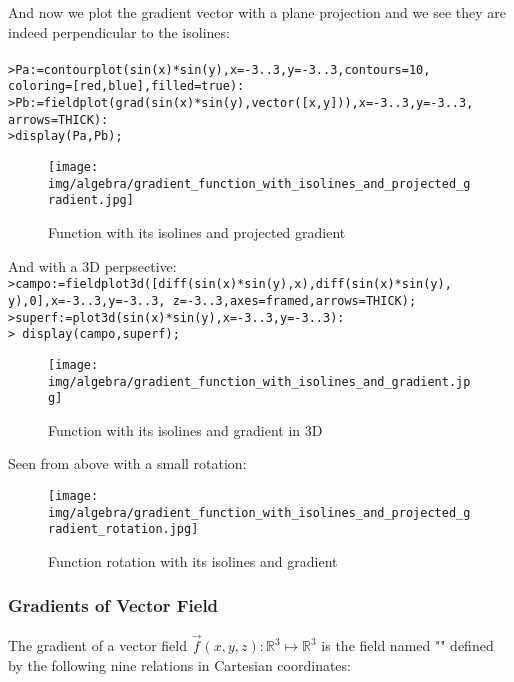 	\pagebreak
	\begin{tcolorbox}[colframe=black,colback=white,sharp corners]

	And now we plot the gradient vector with a plane projection and we see they are indeed perpendicular to the isolines:\\\\
		\texttt{>Pa:=contourplot(sin(x)*sin(y),x=-3..3,y=-3..3,contours=10,\\
		coloring=[red,blue],filled=true):
\\
	>Pb:=fieldplot(grad(sin(x)*sin(y),vector([x,y])),x=-3..3,y=-3..3,\\
	arrows=THICK):\\
	>display(Pa,Pb);}
	\begin{figure}[H]
		\centering
		\texttt{[image: img/algebra/gradient\_function\_with\_isolines\_and\_projected\_gradient.jpg]}
		\caption[]{Function with its isolines and projected gradient}
	\end{figure}
	And with a 3D perpsective:\\
	
	\texttt{>campo:=fieldplot3d([diff(sin(x)*sin(y),x),diff(sin(x)*sin(y),\\
	y),0],x=-3..3,y=-3..3,
z=-3..3,axes=framed,arrows=THICK);\\
>superf:=plot3d(sin(x)*sin(y),x=-3..3,y=-3..3):
\\
	> display({campo,superf});}
	\begin{figure}[H]
		\centering
		\texttt{[image: img/algebra/gradient\_function\_with\_isolines\_and\_gradient.jpg]}
		\caption[]{Function with its isolines and gradient in 3D}
	\end{figure}
	\end{tcolorbox}

	\pagebreak
	\begin{tcolorbox}[colframe=black,colback=white,sharp corners]
	Seen from above with a small rotation:\\
	\begin{figure}[H]
		\centering
		\texttt{[image: img/algebra/gradient\_function\_with\_isolines\_and\_projected\_gradient\_rotation.jpg]}
		\caption[]{Function rotation with its isolines and gradient}
	\end{figure}
	\end{tcolorbox}
	
	\subsubsection{Gradients of Vector Field}
	The gradient of a vector field $\vec{f}(x,y,z): \mathbb{R}^3\mapsto\mathbb{R}^3$ is the field named "" defined by the following nine relations in Cartesian coordinates:
	 
